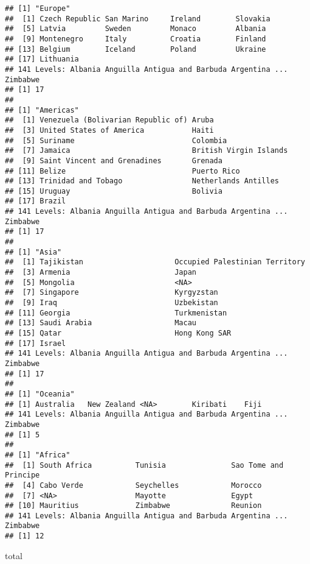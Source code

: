 \documentclass[]{article}
\newenvironment{Shaded}{\begin{snugshade}}{\end{snugshade}}
\newcommand{\NormalTok}[1]{#1}
\begin{document}
\begin{verbatim}
## [1] "Europe"
##  [1] Czech Republic San Marino     Ireland        Slovakia      
##  [5] Latvia         Sweden         Monaco         Albania       
##  [9] Montenegro     Italy          Croatia        Finland       
## [13] Belgium        Iceland        Poland         Ukraine       
## [17] Lithuania     
## 141 Levels: Albania Anguilla Antigua and Barbuda Argentina ... Zimbabwe
## [1] 17
## 
## [1] "Americas"
##  [1] Venezuela (Bolivarian Republic of) Aruba                             
##  [3] United States of America           Haiti                             
##  [5] Suriname                           Colombia                          
##  [7] Jamaica                            British Virgin Islands            
##  [9] Saint Vincent and Grenadines       Grenada                           
## [11] Belize                             Puerto Rico                       
## [13] Trinidad and Tobago                Netherlands Antilles              
## [15] Uruguay                            Bolivia                           
## [17] Brazil                            
## 141 Levels: Albania Anguilla Antigua and Barbuda Argentina ... Zimbabwe
## [1] 17
## 
## [1] "Asia"
##  [1] Tajikistan                     Occupied Palestinian Territory
##  [3] Armenia                        Japan                         
##  [5] Mongolia                       <NA>                          
##  [7] Singapore                      Kyrgyzstan                    
##  [9] Iraq                           Uzbekistan                    
## [11] Georgia                        Turkmenistan                  
## [13] Saudi Arabia                   Macau                         
## [15] Qatar                          Hong Kong SAR                 
## [17] Israel                        
## 141 Levels: Albania Anguilla Antigua and Barbuda Argentina ... Zimbabwe
## [1] 17
## 
## [1] "Oceania"
## [1] Australia   New Zealand <NA>        Kiribati    Fiji       
## 141 Levels: Albania Anguilla Antigua and Barbuda Argentina ... Zimbabwe
## [1] 5
## 
## [1] "Africa"
##  [1] South Africa          Tunisia               Sao Tome and Principe
##  [4] Cabo Verde            Seychelles            Morocco              
##  [7] <NA>                  Mayotte               Egypt                
## [10] Mauritius             Zimbabwe              Reunion              
## 141 Levels: Albania Anguilla Antigua and Barbuda Argentina ... Zimbabwe
## [1] 12
\end{verbatim}

\begin{Shaded}
\begin{Highlighting}[]
\NormalTok{total}
\end{Highlighting}
\end{Shaded}
\end{document}
